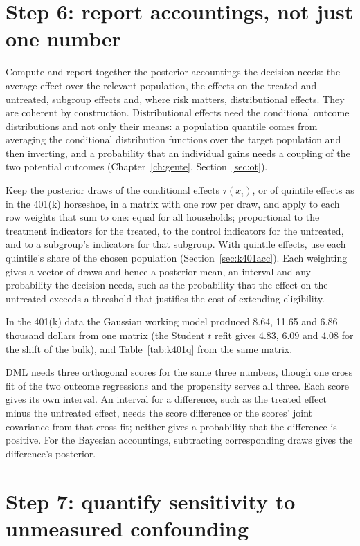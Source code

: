 \section{Step 6: report accountings, not just one number}

Compute and report together the posterior accountings the decision needs: the average effect over the relevant population, the effects on the treated and untreated, subgroup effects and, where risk matters, distributional effects. They are coherent by construction. Distributional effects need the conditional outcome distributions and not only their means: a population quantile comes from averaging the conditional distribution functions over the target population and then inverting, and a probability that an individual gains needs a coupling of the two potential outcomes (Chapter~\ref{ch:gente}, Section~\ref{sec:ot}).

Keep the posterior draws of the conditional effects $\tau(x_i)$, or of quintile effects as in the 401(k) horseshoe, in a matrix with one row per draw, and apply to each row weights that sum to one: equal for all households; proportional to the treatment indicators for the treated, to the control indicators for the untreated, and to a subgroup's indicators for that subgroup. With quintile effects, use each quintile's share of the chosen population (Section~\ref{sec:k401acc}). Each weighting gives a vector of draws and hence a posterior mean, an interval and any probability the decision needs, such as the probability that the effect on the untreated exceeds a threshold that justifies the cost of extending eligibility.

In the 401(k) data the Gaussian working model produced 8.64, 11.65 and 6.86 thousand dollars from one matrix (the Student $t$ refit gives 4.83, 6.09 and 4.08 for the shift of the bulk), and Table~\ref{tab:k401q} from the same matrix.

DML needs three orthogonal scores for the same three numbers, though one cross fit of the two outcome regressions and the propensity serves all three. Each score gives its own interval. An interval for a difference, such as the treated effect minus the untreated effect, needs the score difference or the scores' joint covariance from that cross fit; neither gives a probability that the difference is positive. For the Bayesian accountings, subtracting corresponding draws gives the difference's posterior.

\section{Step 7: quantify sensitivity to unmeasured confounding}

